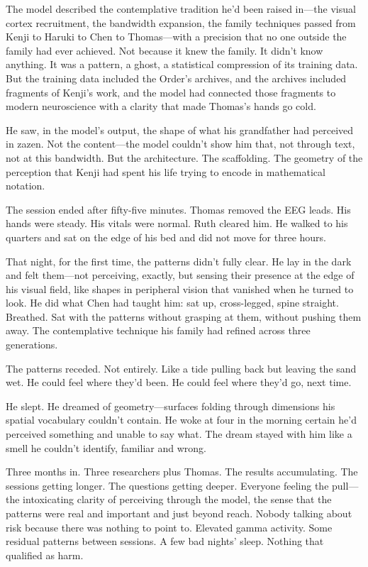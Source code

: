 The model described the contemplative tradition he'd been raised in---the visual cortex recruitment, the bandwidth expansion, the family techniques passed from Kenji to Haruki to Chen to Thomas---with a precision that no one outside the family had ever achieved. Not because it knew the family. It didn't know anything. It was a pattern, a ghost, a statistical compression of its training data. But the training data included the Order's archives, and the archives included fragments of Kenji's work, and the model had connected those fragments to modern neuroscience with a clarity that made Thomas's hands go cold.

He saw, in the model's output, the shape of what his grandfather had perceived in zazen. Not the content---the model couldn't show him that, not through text, not at this bandwidth. But the architecture. The scaffolding. The geometry of the perception that Kenji had spent his life trying to encode in mathematical notation.

The session ended after fifty-five minutes. Thomas removed the EEG leads. His hands were steady. His vitals were normal. Ruth cleared him. He walked to his quarters and sat on the edge of his bed and did not move for three hours.

That night, for the first time, the patterns didn't fully clear. He lay in the dark and felt them---not perceiving, exactly, but sensing their presence at the edge of his visual field, like shapes in peripheral vision that vanished when he turned to look. He did what Chen had taught him: sat up, cross-legged, spine straight. Breathed. Sat with the patterns without grasping at them, without pushing them away. The contemplative technique his family had refined across three generations.

The patterns receded. Not entirely. Like a tide pulling back but leaving the sand wet. He could feel where they'd been. He could feel where they'd go, next time.

He slept. He dreamed of geometry---surfaces folding through dimensions his spatial vocabulary couldn't contain. He woke at four in the morning certain he'd perceived something and unable to say what. The dream stayed with him like a smell he couldn't identify, familiar and wrong.

Three months in. Three researchers plus Thomas. The results accumulating. The sessions getting longer. The questions getting deeper. Everyone feeling the pull---the intoxicating clarity of perceiving through the model, the sense that the patterns were real and important and just beyond reach. Nobody talking about risk because there was nothing to point to. Elevated gamma activity. Some residual patterns between sessions. A few bad nights' sleep. Nothing that qualified as harm.

